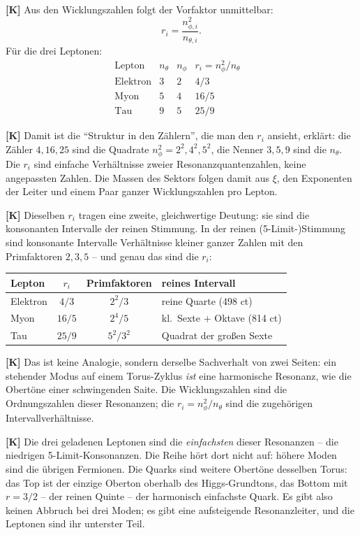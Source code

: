 \textbf{[K]} Aus den Wicklungszahlen folgt der Vorfaktor unmittelbar:
\[
  r_i = \frac{n_{\phi,i}^2}{n_{\theta,i}}.
\]
Für die drei Leptonen:
\[
  \begin{array}{lcccl}
    \text{Lepton} & n_\theta & n_\phi & r_i = n_\phi^2/n_\theta & \\[2pt]
    \text{Elektron} & 3 & 2 & 4/3  & \\
    \text{Myon}     & 5 & 4 & 16/5 & \\
    \text{Tau}      & 9 & 5 & 25/9 & 
  \end{array}
\]

\textbf{[K]} Damit ist die \enquote{Struktur in den Zählern}, die man den $r_i$
ansieht, erklärt: die Zähler $4, 16, 25$ sind die Quadrate $n_\phi^2 = 2^2, 4^2,
5^2$, die Nenner $3, 5, 9$ sind die $n_\theta$. Die $r_i$ sind einfache
Verhältnisse zweier Resonanzquantenzahlen, keine angepassten Zahlen. Die Massen
des Sektors folgen damit aus $\xi$, den Exponenten der Leiter und einem Paar
ganzer Wicklungszahlen pro Lepton.

\textbf{[K]} Dieselben $r_i$ tragen eine zweite, gleichwertige Deutung: sie sind
die konsonanten Intervalle der reinen Stimmung. In der reinen (5-Limit-)Stimmung
sind konsonante Intervalle Verhältnisse kleiner ganzer Zahlen mit den
Primfaktoren $2, 3, 5$ -- und genau das sind die $r_i$:
\begin{center}
\begin{tabular}{lccl}
\hline
Lepton & $r_i$ & Primfaktoren & reines Intervall \\
\hline
Elektron & $4/3$  & $2^2/3$   & reine Quarte (498 ct) \\
Myon     & $16/5$ & $2^4/5$   & kl.\ Sexte + Oktave (814 ct) \\
Tau      & $25/9$ & $5^2/3^2$ & Quadrat der großen Sexte \\
\hline
\end{tabular}
\end{center}

\textbf{[K]} Das ist keine Analogie, sondern derselbe Sachverhalt von zwei
Seiten: ein stehender Modus auf einem Torus-Zyklus \emph{ist} eine harmonische
Resonanz, wie die Obertöne einer schwingenden Saite. Die Wicklungszahlen sind
die Ordnungszahlen dieser Resonanzen; die $r_i = n_\phi^2/n_\theta$ sind die
zugehörigen Intervallverhältnisse.

\textbf{[K]} Die drei geladenen Leptonen sind die \emph{einfachsten} dieser
Resonanzen -- die niedrigen 5-Limit-Konsonanzen. Die Reihe hört dort nicht auf:
höhere Moden sind die übrigen Fermionen. Die Quarks sind weitere Obertöne desselben Torus: das Top ist der einzige
Oberton oberhalb des Higgs-Grundtons, das Bottom mit $r=3/2$ -- der reinen
Quinte -- der harmonisch einfachste Quark. Es gibt also keinen Abbruch bei drei
Moden; es gibt eine aufsteigende Resonanzleiter, und die Leptonen sind ihr
unterster Teil.

